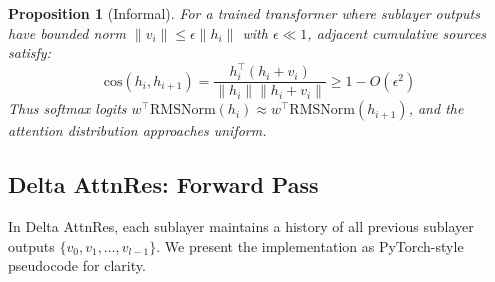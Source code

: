 \documentclass{article}
\newtheorem{proposition}{Proposition}
\begin{document}
\begin{proposition}[Informal]
For a trained transformer where sublayer outputs have bounded norm $\|v_i\| \leq \epsilon \|h_i\|$ with $\epsilon \ll 1$, adjacent cumulative sources satisfy:
\begin{equation}
    \mathrm{cos}(h_i, h_{i+1}) = \frac{h_i^\top (h_i + v_i)}{\|h_i\|\|h_i + v_i\|} \geq 1 - O(\epsilon^2)
\end{equation}
Thus softmax logits $w^\top \mathrm{RMSNorm}(h_i) \approx w^\top \mathrm{RMSNorm}(h_{i+1})$, and the attention distribution approaches uniform.
\end{proposition}

\subsection{Delta AttnRes: Forward Pass}

In Delta AttnRes, each sublayer maintains a history of all previous sublayer outputs $\{v_0, v_1, \ldots, v_{l-1}\}$. We present the implementation as PyTorch-style pseudocode for clarity.
\end{document}

